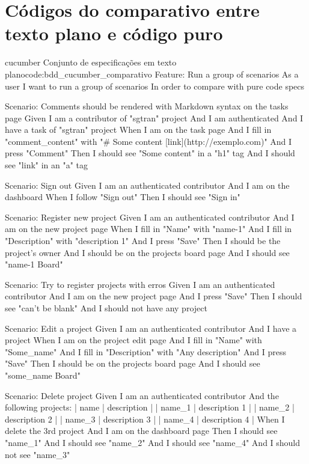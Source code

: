 \chapter{Códigos do comparativo entre texto plano e código puro}
\label{cha:codigo_do_comparativo}

\begin{mycode}{cucumber}%
{Conjunto de especificações em texto plano}{code:bdd_cucumber_comparativo}
Feature: Run a group of scenarios
  As a user
  I want to run a group of scenarios
  In order to compare with pure code specs

  Scenario: Comments should be rendered with Markdown syntax on the tasks page
    Given I am a contributor of "sgtran" project
    And I am authenticated
    And I have a task of "sgtran" project
    When I am on the task page
    And I fill in "comment_content" with "# Some content [link](http://exemplo.com)"
    And I press "Comment"
    Then I should see "Some content" in a "h1" tag
    And I should see "link" in an "a" tag

  Scenario: Sign out
    Given I am an authenticated contributor
    And I am on the dashboard
    When I follow "Sign out"
    Then I should see "Sign in"

  Scenario: Register new project
    Given I am an authenticated contributor
    And I am on the new project page
    When I fill in "Name" with "name-1"
    And I fill in "Description" with "description 1"
    And I press "Save"
    Then I should be the project's owner
    And I should be on the projects board page
    And I should see "name-1 Board"

  Scenario: Try to register projects with erros
    Given I am an authenticated contributor
    And I am on the new project page
    And I press "Save"
    Then I should see "can't be blank"
    And I should not have any project

  Scenario: Edit a project
    Given I am an authenticated contributor
    And I have a project
    When I am on the project edit page
    And I fill in "Name" with "Some_name"
    And I fill in "Description" with "Any description"
    And I press "Save"
    Then I should be on the projects board page
    And I should see "some_name Board"

  Scenario: Delete project
    Given I am an authenticated contributor
    And the following projects:
      | name   | description   |
      | name_1 | description 1 |
      | name_2 | description 2 |
      | name_3 | description 3 |
      | name_4 | description 4 |
    When I delete the 3rd project
    And I am on the dashboard page
    Then I should see "name_1"
    And I should see "name_2"
    And I should see "name_4"
    And I should not see "name_3"


\end{mycode}
